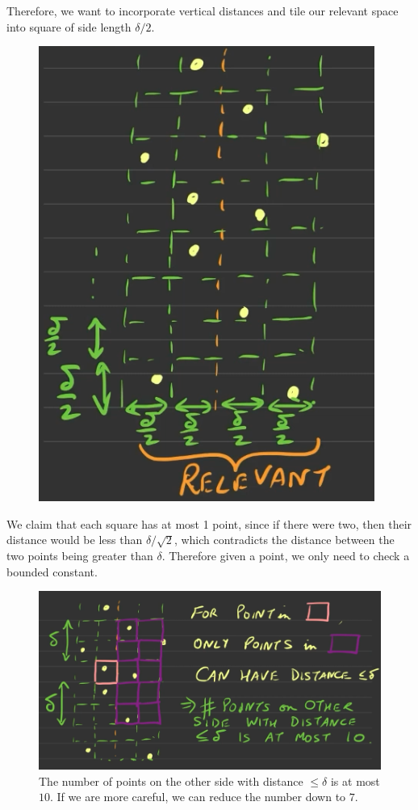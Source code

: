   Therefore, we want to incorporate vertical distances and tile our relevant space into square of side length $\delta/2$.  

  \begin{figure}[H]
    \centering 
    \includegraphics[scale=0.4]{img/cp3.png}
    \caption{} 
    \label{fig:closest_point3}
  \end{figure}

  We claim that each square has at most 1 point, since if there were two, then their distance would be less than $\delta / \sqrt{2}$, which contradicts the distance between the two points being greater than $\delta$. Therefore given a point, we only need to check a bounded constant. 

  \begin{figure}[H]
    \centering 
    \includegraphics[scale=0.4]{img/cp4.png}
    \caption{The number of points on the other side with distance $\leq \delta$ is at most $10$. If we are more careful, we can reduce the number down to $7$. } 
    \label{fig:closest_point4}
  \end{figure}

